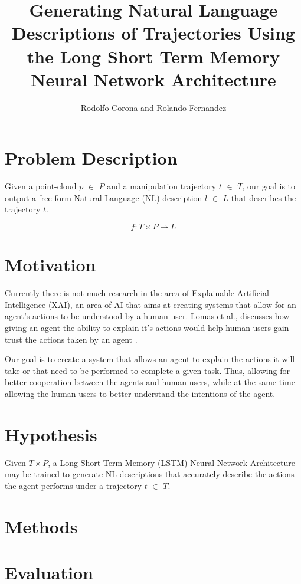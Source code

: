 \documentclass[letterpaper, 12 pt, conference]{ieeeconf}
\title{\LARGE \bf
Generating Natural Language Descriptions of Trajectories Using the Long Short Term Memory Neural Network Architecture}
\author{Rodolfo Corona and Rolando Fernandez}
\begin{document}
\maketitle
\thispagestyle{empty}
\pagestyle{empty}


\section{Problem Description}

Given a point-cloud $p$ $\in$ $P$ and a manipulation trajectory $t$ $\in$ $T$, our goal is to output a free-form  Natural Language (NL) description $l$ $\in$ $L$ that describes the trajectory $t$.

\begin{equation}
f: T\times P \mapsto L
\end{equation}

\section{Motivation}

Currently there is not much research in the area of Explainable Artificial Intelligence (XAI), an area of AI that aims at creating systems that allow for an agent's actions to be understood by a human user. Lomas et al., discusses how giving an agent the ability to explain it's actions would help human users gain trust the actions taken by an agent \cite{lomas2012explaining}.

Our goal is to create a system that allows an agent to explain the actions it will take or that need to be performed to complete a given task. Thus, allowing for better cooperation between the agents and human users, while at the same time allowing the human users to better understand the intentions of the agent.

\section{Hypothesis}

Given $T\times P$, a Long Short Term Memory (LSTM) Neural Network Architecture may be trained to generate NL descriptions that accurately describe the actions the agent performs under a trajectory $t$ $\in$ $T$.

\section{Methods}

\section{Evaluation}
\end{document}
